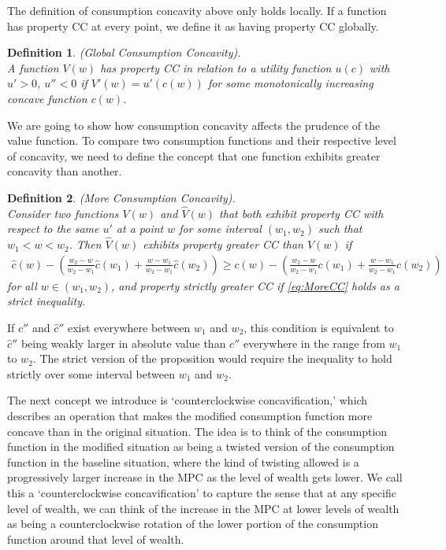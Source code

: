 \documentclass[titlepage]{\econtex}
\newtheorem{defn}{Definition}
\begin{document}
The definition of consumption concavity above only holds locally. If a function has property CC at every point, we define it as having property CC globally.
\begin{defn}\label{defn:PropCC} (Global Consumption Concavity). \\  A function $V(w)$ has property CC in relation to a utility function $u(c)$ with $u'>0$, $u''<0$ if $V'(w) = u'(c(w))$ for some monotonically increasing concave function $c(w)$.
\end{defn}







We are going to show how consumption concavity affects the prudence of the value function. To compare two consumption functions and their respective level of concavity, we need to define the concept that one function exhibits greater concavity than another.

\begin{defn}\label{defn:MoreCC} (More Consumption Concavity). \\ Consider two functions $V(w)$ and $\hat{V}(w)$
	that both exhibit property CC with respect to the same $u'$
	at a point $w$ for some interval $(w_1,w_2)$ such that $w_1 < w <
	w_2$.  Then $\hat{V}(w)$ exhibits property greater CC than $V(w)$ if
	\begin{eqnarray}
	\hat{c}(w) - \left(\frac{w_{2}-w}{w_{2}-w_{1}} \hat{c}(w_{1})+\frac{w-w_{1}}{w_{2}-w_{1}}\hat{c}(w_{2})\right) \geq c(w) - \left(\frac{w_{2}-w}{w_{2}-w_{1}} c(w_{1})+\frac{w-w_{1}}{w_{2}-w_{1}}c(w_{2})\right) \label{eq:MoreCC}
	\end{eqnarray}
	for all $w \in (w_{1},w_{2})$, and property strictly greater CC if \eqref{eq:MoreCC}
	holds as a strict inequality.
\end{defn}

If $c''$ and $\hat{c}''$ exist everywhere between $w_1$ and $w_2$, this condition is equivalent to $\hat{c}''$ being weakly larger in absolute value than $c''$ everywhere in the range from $w_1$ to $w_2$. The strict version of the proposition would require the inequality to hold strictly over some interval between $w_1$ and $w_2$.

The next concept we introduce is `counterclockwise concavification,' which describes an operation that makes the modified consumption function more concave than in the original situation. The idea is to think of the consumption function in the modified situation as being a twisted version of the consumption function in the baseline situation, where the kind of twisting allowed is a progressively larger increase in the MPC as the level of wealth gets lower. We call this a `counterclockwise concavification' to capture the sense that at any specific level of wealth, we can think of the increase in the MPC at lower levels of wealth as being a counterclockwise rotation of the lower portion of the consumption function around that level of wealth.
\end{document}
